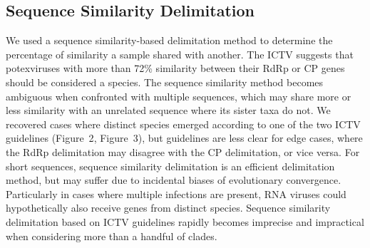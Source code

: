 \documentclass[fleqn,10pt,lineno]{wlpeerj}
\begin{document}
{\subsection*{Sequence Similarity Delimitation}
We used a sequence similarity-based delimitation method to determine the percentage of similarity a sample shared with another.
The ICTV suggests that potexviruses with more than 72\% similarity between their RdRp or CP genes should be considered a species.
The sequence similarity method becomes ambiguous when confronted with multiple sequences, which may share more or less similarity with an unrelated sequence where its sister taxa do not. 
We recovered cases where distinct species emerged according to one of the two ICTV guidelines ({Figure~2}, {Figure~3}), but guidelines are less clear for edge cases, where the RdRp delimitation may disagree with the CP delimitation, or vice versa.
For short sequences, sequence similarity delimitation is an efficient delimitation method, but may suffer due to incidental biases of evolutionary convergence.
Particularly in cases where multiple infections are present, RNA viruses could hypothetically also receive genes from distinct species.
Sequence similarity delimitation based on ICTV guidelines rapidly becomes imprecise and impractical when considering more than a handful of clades.

}
\end{document}
